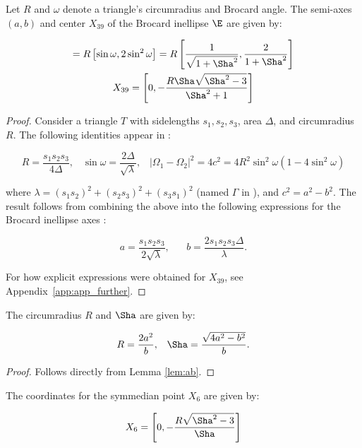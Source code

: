 \begin{lemma}
Let $R$ and $\omega$ denote a triangle's circumradius and Brocard angle. The semi-axes $(a,b)$ and center $X_{39}$ of the Brocard inellipse $\E$ are given by:

\begin{gather*}
[a,b]= R\left[\sin\omega,2\sin^2\omega\right]=R\left[\frac{1}{\sqrt{1+\Sha^2}},\frac{2}{{1+\Sha^2}}\right]\\
 X_{39}=\left[0,-\frac{R\Sha\sqrt{\Sha^2-3}}{\Sha^2+1}\right]
\end{gather*}
 \label{lem:ab}
\end{lemma}

\begin{proof}

Consider a triangle $T$ with sidelengths $s_1,s_2,s_3$, area  $\Delta$, and circumradius  $R$. The following identities appear in \cite{bradley2007-brocard,shail1996-brocard}:

\[R=\frac{s_1 s_2 s_3}{4\Delta}, \;\;\; \sin\omega=\frac{2\Delta}{\sqrt{\lambda}},\;\;\; |\Omega_1-\Omega_2|^2=4c^2=4R^2\sin^2\omega (1-4\sin^2\omega)\]

\noindent where $\lambda=(s_1 s_2)^2+(s_2 s_3)^2+ (s_3 s_1)^2$ (named $\Gamma$ in \cite[Eqn. 2]{shail1996-brocard}), and $c^2=a^2-b^2$. The result follows from combining the above into the following expressions for the Brocard inellipse axes \cite[Brocard Inellipse]{mw}:

\[ a =\frac{s_1 s_2 s_3}{2\sqrt{\lambda}},\;\;\;\;\;\; b =\frac{2 s_1 s_2 s_3 \Delta}{\lambda}.\]

\noindent For how explicit expressions were obtained for $X_{39}$, see Appendix~\ref{app:app_further}.

\end{proof}

\begin{proposition}
The circumradius $R$ and $\Sha$ are given by:

 \[R=\frac{2 a^2}{b},\;\;\; \Sha=\frac{\sqrt{4 a^2-b^2}}{b}.\]
 \label{prop:wRab}
\end{proposition}

\begin{proof}
Follows directly from Lemma \ref{lem:ab}.
\end{proof}

\begin{lemma}
The coordinates for the symmedian point $X_6$ are given by:

\[
X_6=\left[0,-\frac{R\sqrt{ \Sha^2 -3}}{ \Sha}\right] \]
\label{lem:x6}
\end{lemma}


